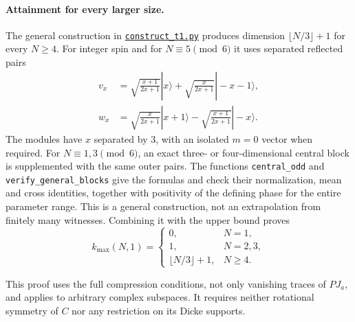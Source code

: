 \documentclass[11pt]{article}
\begin{document}
\paragraph{Attainment for every larger size.}
The general construction in
\href{../analytical-constructions/construct_t1.py}{\texttt{construct\_t1.py}}
produces dimension $\lfloor N/3\rfloor+1$ for every $N\ge4$.
For integer spin and for $N\equiv5\pmod6$ it uses separated reflected pairs
\begin{align*}
 v_x&=\sqrt{\frac{x+1}{2x+1}}|x\rangle
       +\sqrt{\frac{x}{2x+1}}|-x-1\rangle,\\
 w_x&=\sqrt{\frac{x}{2x+1}}|x+1\rangle
       -\sqrt{\frac{x+1}{2x+1}}|-x\rangle.
\end{align*}
The modules have $x$ separated by $3$, with an isolated $m=0$ vector when
required. For $N\equiv1,3\pmod6$, an exact three- or four-dimensional
central block is supplemented with the same outer pairs. The functions
\texttt{central\_odd} and \texttt{verify\_general\_blocks} give the formulas
and check their normalization, mean and cross identities, together with
positivity of the defining phase for the entire parameter range. This is a
general construction, not an extrapolation from finitely many witnesses.
Combining it with the upper bound proves
\[
\boxed{\quad k_{\max}(N,1)=
 \begin{cases}
 0,&N=1,\\
 1,&N=2,3,\\
 \lfloor N/3\rfloor+1,&N\ge4.
 \end{cases}\quad}
\]

This proof uses the full compression conditions, not only vanishing traces
of $PJ_a$, and applies to arbitrary complex subspaces. It requires neither
rotational symmetry of $C$ nor any restriction on its Dicke supports.
\end{document}
